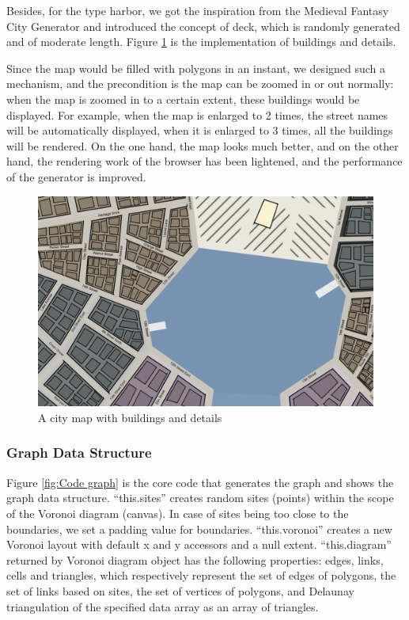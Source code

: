 Besides, for the type harbor, we got the inspiration from the Medieval Fantasy City Generator and introduced the concept of deck, which is randomly generated and of moderate length. Figure \ref{fig:buildings} is the implementation of buildings and details.

Since the map would be filled with polygons in an instant, we designed such a mechanism, and the precondition is the map can be zoomed in or out normally: when the map is zoomed in to a certain extent, these buildings would be displayed. For example, when the map is enlarged to 2 times, the street names will be automatically displayed, when it is enlarged to 3 times, all the buildings will be rendered. On the one hand, the map looks much better, and on the other hand, the rendering work of the browser has been lightened, and the performance of the generator is improved.

\begin{figure}[htbp]
  \centering
  \includegraphics[width=\textwidth]{section04/assets/Map-details.png}
  \caption{A city map with buildings and details}
  \label{fig:buildings}
\end{figure}

\subsubsection{Graph Data Structure}
Figure \ref{fig:Code graph} is the core code that generates the graph and shows the graph data structure. ``this.sites'' creates random sites (points) within the scope of the Voronoi diagram (canvas). In case of sites being too close to the boundaries, we set a padding value for boundaries. ``this.voronoi'' creates a new Voronoi layout with default x and y accessors and a null extent. ``this.diagram'' returned by Voronoi diagram object has the following properties: edges, links, cells and triangles, which respectively represent the set of edges of polygons, the set of links based on sites, the set of vertices of polygons, and Delaunay triangulation of the specified data array as an array of triangles.

